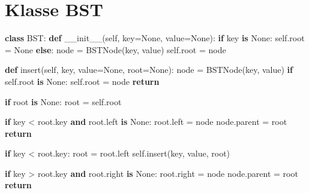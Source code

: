 \documentclass[
  nswissgerman,
  a4paper,
  DIV=11,
  numbers=noendperiod,
  ngerman]{scrreprt}
\newenvironment{Shaded}{\begin{snugshade}}{\end{snugshade}}
\newcommand{\ControlFlowTok}[1]{\textcolor[rgb]{0.00,0.23,0.31}{\textbf{#1}}}
\newcommand{\FunctionTok}[1]{\textcolor[rgb]{0.28,0.35,0.67}{#1}}
\newcommand{\KeywordTok}[1]{\textcolor[rgb]{0.00,0.23,0.31}{\textbf{#1}}}
\newcommand{\NormalTok}[1]{\textcolor[rgb]{0.00,0.23,0.31}{#1}}
\newcommand{\OperatorTok}[1]{\textcolor[rgb]{0.37,0.37,0.37}{#1}}
\newcommand{\VariableTok}[1]{\textcolor[rgb]{0.07,0.07,0.07}{#1}}
\begin{document}
\section{Klasse BST}\label{klasse-bst}

\begin{Shaded}
\begin{Highlighting}[numbers=left,,]
\KeywordTok{class}\NormalTok{ BST:}
    \KeywordTok{def} \FunctionTok{\_\_init\_\_}\NormalTok{(}\VariableTok{self}\NormalTok{, key}\OperatorTok{=}\VariableTok{None}\NormalTok{, value}\OperatorTok{=}\VariableTok{None}\NormalTok{):}
        \ControlFlowTok{if}\NormalTok{ key }\KeywordTok{is} \VariableTok{None}\NormalTok{:}
            \VariableTok{self}\NormalTok{.root }\OperatorTok{=} \VariableTok{None}
        \ControlFlowTok{else}\NormalTok{:}
\NormalTok{            node }\OperatorTok{=}\NormalTok{ BSTNode(key, value)            }
            \VariableTok{self}\NormalTok{.root }\OperatorTok{=}\NormalTok{ node}
            
    \KeywordTok{def}\NormalTok{ insert(}\VariableTok{self}\NormalTok{, key, value}\OperatorTok{=}\VariableTok{None}\NormalTok{, root}\OperatorTok{=}\VariableTok{None}\NormalTok{):}
\NormalTok{        node }\OperatorTok{=}\NormalTok{ BSTNode(key, value)}
        \ControlFlowTok{if} \VariableTok{self}\NormalTok{.root }\KeywordTok{is} \VariableTok{None}\NormalTok{:}
            \VariableTok{self}\NormalTok{.root }\OperatorTok{=}\NormalTok{ node}
            \ControlFlowTok{return}

        \ControlFlowTok{if}\NormalTok{ root }\KeywordTok{is} \VariableTok{None}\NormalTok{:}
\NormalTok{            root }\OperatorTok{=} \VariableTok{self}\NormalTok{.root}
        
        \ControlFlowTok{if}\NormalTok{ key }\OperatorTok{\textless{}}\NormalTok{ root.key }\KeywordTok{and}\NormalTok{ root.left }\KeywordTok{is} \VariableTok{None}\NormalTok{:}
\NormalTok{            root.left }\OperatorTok{=}\NormalTok{ node}
\NormalTok{            node.parent }\OperatorTok{=}\NormalTok{ root}
            \ControlFlowTok{return}

        \ControlFlowTok{if}\NormalTok{ key }\OperatorTok{\textless{}}\NormalTok{ root.key:}
\NormalTok{            root }\OperatorTok{=}\NormalTok{ root.left}
            \VariableTok{self}\NormalTok{.insert(key, value, root)}
            
        
        \ControlFlowTok{if}\NormalTok{ key }\OperatorTok{\textgreater{}}\NormalTok{ root.key }\KeywordTok{and}\NormalTok{ root.right }\KeywordTok{is} \VariableTok{None}\NormalTok{:}
\NormalTok{            root.right }\OperatorTok{=}\NormalTok{ node}
\NormalTok{            node.parent }\OperatorTok{=}\NormalTok{ root}
            \ControlFlowTok{return}


\end{Highlighting}
\end{Shaded}
\end{document}
